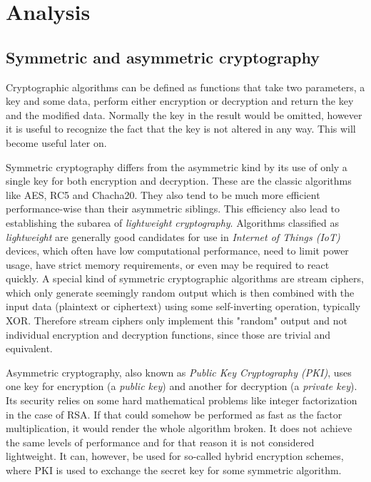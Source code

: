 \documentclass[a4paper,10pt,openright]{memoir}
\newcommand{\term}[1]{\textit{#1}}
\begin{document}
\chapter{Analysis}


\section{Symmetric and asymmetric cryptography}

Cryptographic algorithms can be defined as functions that take two 
parameters, a key and some data, perform either encryption or 
decryption and return the key and the modified data. Normally the key 
in the result would be omitted, however it is useful to recognize the 
fact that the key is not altered in any way. This will become useful 
later on.

Symmetric cryptography differs from the asymmetric kind by its use of 
only a single key for both encryption and decryption. These are the 
classic algorithms like AES, RC5 and Chacha20. They also tend to be 
much more efficient performance-wise than their asymmetric siblings. 
This efficiency also lead to establishing the subarea of 
\term{lightweight cryptography}. Algorithms classified as 
\term{lightweight} are generally good candidates for use in 
\term{Internet of Things (IoT)} devices, which often have low 
computational performance, need to limit power usage, have strict 
memory requirements, or even may be required to react quickly. A 
special kind of symmetric cryptographic algorithms are stream ciphers, 
which only generate seemingly random output which is then combined with 
the input data (plaintext or ciphertext) using some self-inverting 
operation, typically XOR. Therefore stream ciphers only implement this 
"random" output and not individual encryption and decryption functions, 
since those are trivial and equivalent.

Asymmetric cryptography, also known as \term{Public Key Cryptography 
(PKI)}, uses one key for encryption (a \term{public key}) and another 
for decryption (a \term{private key}). Its security relies on some hard 
mathematical problems like integer factorization in the case of RSA. If 
that could somehow be performed as fast as the factor multiplication, 
it would render the whole algorithm broken. It does not achieve the 
same levels of performance \cite{sym-asym} and for that reason it is not 
considered lightweight. It can, however, be used for so-called hybrid 
encryption schemes, where PKI is used to exchange the secret key for 
some symmetric algorithm.
\end{document}
